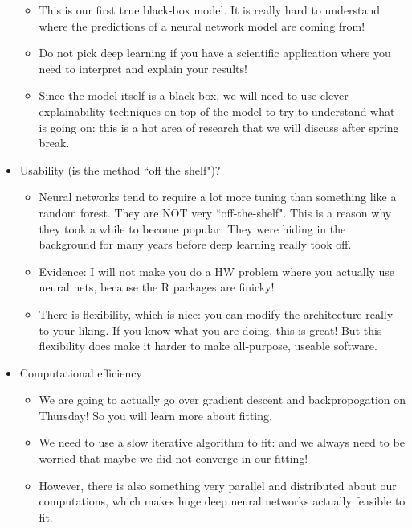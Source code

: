 \begin{itemize}
\begin{itemize}
\item This is our first true black-box model. It is really hard to understand where the predictions of a neural network model are coming from!
\item Do not pick deep learning if you have a scientific application where you need to interpret and explain your results!
\item Since the model itself is a black-box, we will need to use clever explainability techniques on top of the model to try to understand what is going on: this is a hot area of research that we will discuss after spring break.  
\end{itemize}
\item Usability (is the method ``off the shelf")?
\begin{itemize}
\item Neural networks tend to require a lot more tuning than something like a random forest. They are NOT very ``off-the-shelf". This is a reason why they took a while to become popular. They were hiding in the background for many years before deep learning really took off. 
 \item Evidence: I will not make you do a HW problem where you actually use neural nets, because the R packages are finicky! 
\item There is flexibility, which is nice: you can modify the architecture really to your liking. If you know what you are doing, this is great! But this flexibility does make it harder to make all-purpose, useable software. 
\end{itemize}
\item Computational efficiency	
\begin{itemize}
\item We are going to actually go over gradient descent and backpropogation on Thursday! So you will learn more about fitting. 
\item We need to use a slow iterative algorithm to fit: and we always need to be worried that maybe we did not converge in our fitting! 
\item However, there is also something very parallel and distributed about our computations, which makes huge deep neural networks actually feasible to fit. 
\end{itemize}
\end{itemize}




